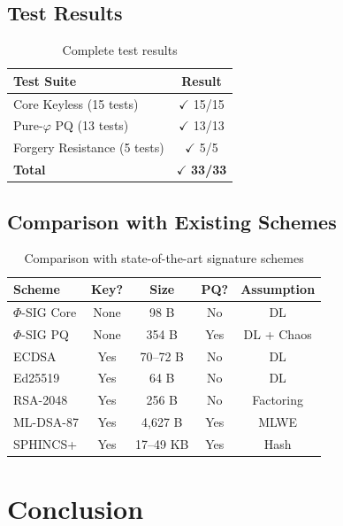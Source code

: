 \documentclass{article}
\begin{document}
\subsection{Test Results}

\begin{table}[H]
\centering
\begin{tabular}{|l|c|}
\hline
\textbf{Test Suite} & \textbf{Result} \\
\hline
Core Keyless (15 tests) & $\checkmark$ 15/15 \\
Pure-$\varphi$ PQ (13 tests) & $\checkmark$ 13/13 \\
Forgery Resistance (5 tests) & $\checkmark$ 5/5 \\
\hline
\textbf{Total} & $\checkmark$ \textbf{33/33} \\
\hline
\end{tabular}
\caption{Complete test results}
\end{table}

\subsection{Comparison with Existing Schemes}

\begin{table}[H]
\centering
\begin{tabular}{|l|c|c|c|c|}
\hline
\textbf{Scheme} & \textbf{Key?} & \textbf{Size} & \textbf{PQ?} & \textbf{Assumption} \\
\hline
$\Phi$-SIG Core & None & 98 B & No & DL \\
$\Phi$-SIG PQ & None & 354 B & Yes & DL + Chaos \\
ECDSA & Yes & 70--72 B & No & DL \\
Ed25519 & Yes & 64 B & No & DL \\
RSA-2048 & Yes & 256 B & No & Factoring \\
ML-DSA-87 & Yes & 4,627 B & Yes & MLWE \\
SPHINCS+ & Yes & 17--49 KB & Yes & Hash \\
\hline
\end{tabular}
\caption{Comparison with state-of-the-art signature schemes}
\end{table}

\section{Conclusion}
\end{document}
